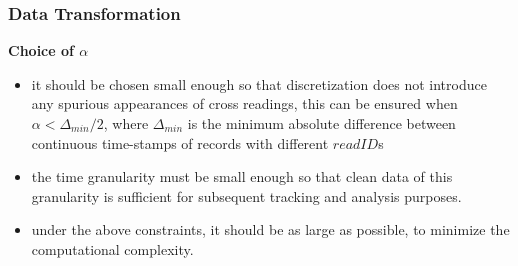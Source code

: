 \begin{frame}
\frametitle{Data Transformation}

\textbf{Choice of $\alpha$} \quad
\begin{itemize}
  \item it should be chosen small enough so that discretization does not introduce any spurious appearances of cross readings, this can be ensured when $\alpha < \Delta_{min} / 2$, where $\Delta_{min}$ is the minimum absolute difference between continuous time-stamps of records with different $readID$s
  \item the time granularity must be small enough so that clean data of this granularity is sufficient for subsequent tracking and analysis purposes.
  \item under the above constraints, it should be as large as possible, to minimize the computational complexity.
\end{itemize}

\end{frame}


